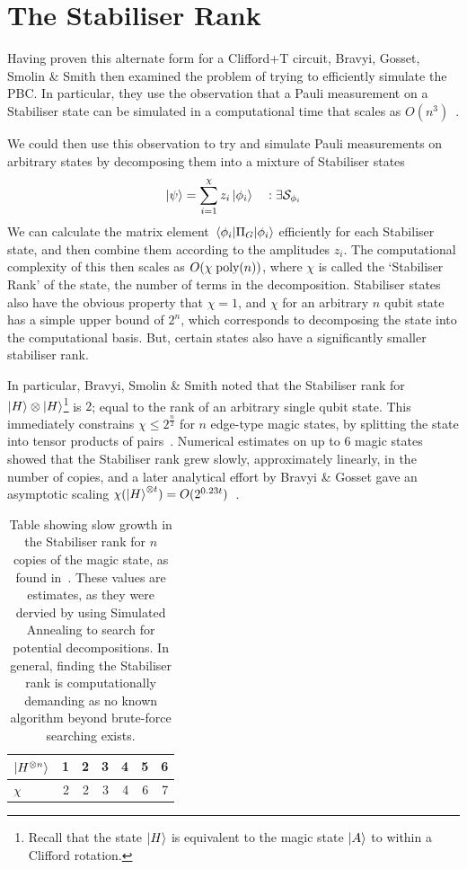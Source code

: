 \documentclass{standalone}
\begin{document}
\section{The Stabiliser Rank}\label{sec:srank}
Having proven this alternate form for a Clifford+T circuit, Bravyi, Gosset, Smolin \& Smith then examined the problem of trying to efficiently simulate the PBC. In particular, they use the observation that a Pauli measurement on a Stabiliser state can be simulated in a computational time that scales as $O(n^{3})$~\cite{Aaronson2004a,Bravyi2015}. 
\par
We could then use this observation to try and simulate Pauli measurements on arbitrary states by decomposing them into a mixture of Stabiliser states 
\begin{equation}
\ket{\psi} = \sum_{i=1}^{\chi}z_{i}\ket{\phi_{i}}\quad:\exists\mathcal{S}_{\phi_i}
\end{equation}
We can calculate the matrix element $\matrixel{\phi_{i}}{\Pi_{G}}{\phi_{i}}$ efficiently for each Stabiliser state, and then combine them according to the amplitudes $z_{i}$. The computational complexity of this then scales as $O(\chi\;\text{poly}(n))$, where $\chi$ is called the `Stabiliser Rank' of the state, the number of terms in the decomposition. Stabiliser states also have the obvious property that $\chi=1$, and $\chi$ for an arbitrary $n$ qubit state has a simple upper bound of $2^{n}$, which corresponds to decomposing the state into the computational basis. But, certain states also have a significantly smaller stabiliser rank.
\par
In particular, Bravyi, Smolin \& Smith noted that the Stabiliser rank for $\ket{H}\otimes\ket{H}$\footnote{Recall that the state $\ket{H}$ is equivalent to the magic state $\ket{A}$ to within a Clifford rotation.} is $2$; equal to the rank of an arbitrary single qubit state. This immediately constrains $\chi\leq 2^{\frac{n}{2}}$ for $n$ edge-type magic states, by splitting the state into tensor products of pairs~\cite{Bravyi2015}. Numerical estimates on up to 6 magic states showed that the Stabiliser rank grew slowly, approximately linearly, in the number of copies, and a later analytical effort by Bravyi \& Gosset gave an asymptotic scaling $\chi(\ket{H}^{\otimes t})=O(2^{0.23 t})$~\cite{Bravyi2016b}.
\par
\begin{table}[h]
\centering
\begin{tabular}{||l|r|r|r|r|r|r||}
\hline
$\ket{H^{\otimes n}}$ & 1 & 2 & 3 & 4 & 5 & 6 \\ \hline
$\chi$ & 2 & 2 & 3 & 4 & 6 & 7\\ \hline
\end{tabular}
\caption{Table showing slow growth in the Stabiliser rank for $n$ copies of the magic state, as found in~\cite{Bravyi2015}. These values are estimates, as they were dervied by using Simulated Annealing to search for potential decompositions. In general, finding the Stabiliser rank is computationally demanding as no known algorithm beyond brute-force searching exists.}
\label{tab:approxchi}
\end{table}
\end{document}
